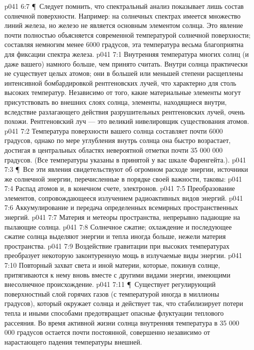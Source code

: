 \vs p041 6:7 \P\ Следует помнить, что спектральный анализ показывает лишь состав солнечной поверхности. Например: на солнечных спектрах имеется множество линий железа, но железо не является основным элементом солнца. Это явление почти полностью объясняется современной температурой солнечной поверхности; составляя немногим менее 6000 градусов, эта температура весьма благоприятна для фиксации спектра железа.
\vs p041 7:1 Внутренняя температура многих солнц (и даже вашего) намного больше, чем принято считать. Внутри солнца практически не существует целых атомов; они в большей или меньшей степени расщеплены интенсивной бомбардировкой рентгеновских лучей, что характерно для столь высоких температур. Независимо от того, какие материальные элементы могут присутствовать во внешних слоях солнца, элементы, находящиеся внутри, вследствие разлагающего действия разрушительных рентгеновских лучей, очень похожи. Рентгеновский луч --- это великий нивелировщик существования атомов.
\vs p041 7:2 Температура поверхности вашего солнца составляет почти 6000 градусов, однако по мере углубления внутрь солнца она быстро возрастает, достигая в центральных областях невероятной отметки почти 35 000 000 градусов. (Все температуры указаны в принятой у вас шкале Фаренгейта.).
\vs p041 7:3 \P\ Все эти явления свидетельствуют об огромном расходе энергии, источники же солнечной энергии, перечисленные в порядке своей важности, таковы:
\vs p041 7:4 \bibnobreakspace Распад атомов и, в конечном счете, электронов.
\vs p041 7:5 \bibnobreakspace Преобразование элементов, сопровождающееся излучением радиоактивных видов энергий.
\vs p041 7:6 \bibnobreakspace Аккумулирование и передача определенных всемирных пространственных энергий.
\vs p041 7:7 \bibnobreakspace Материя и метеоры пространства, непрерывно падающие на пылающие солнца.
\vs p041 7:8 \bibnobreakspace Солнечное сжатие; охлаждение и последующее сжатие солнца выделяют энергии и тепла иногда больше, нежели материя пространства.
\vs p041 7:9 \bibnobreakspace Воздействие гравитации при высоких температурах преобразует некоторую законтуренную мощь в излучаемые виды энергии.
\vs p041 7:10 \bibnobreakspace Повторный захват света и иной материи, которые, покинув солнце, притягиваются к нему вновь вместе с другими видами энергии, имеющими внесолнечное происхождение.
\vs p041 7:11 \P\ Существует регулирующий поверхностный слой горячих газов (с температурой иногда в миллионы градусов), который окружает солнца и действует так, что стабилизирует потери тепла и иными способами предотвращает опасные флуктуации теплового рассеяния. Во время активной жизни солнца внутренняя температура в 35 000 000 градусов остается почти постоянной, совершенно независимо от нарастающего падения температуры внешней.
